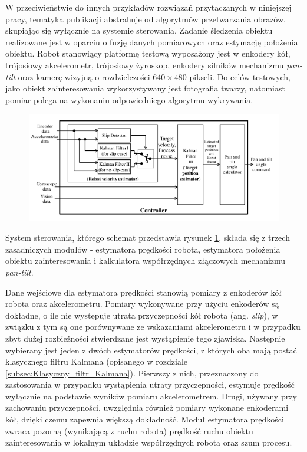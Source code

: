 {W przeciwieństwie do innych przykładów rozwiązań przytaczanych w niniejszej pracy, tematyka publikacji \cite{Kim2012} abstrahuje od algorytmów przetwarzania obrazów, skupiając się wyłącznie na systemie sterowania. Zadanie śledzenia obiektu realizowane jest w oparciu o fuzję danych pomiarowych oraz estymację położenia obiektu. Robot stanowiący platformę testową wyposażony jest w enkodery kół, trójosiowy akcelerometr, trójosiowy żyroskop, enkodery silników mechanizmu \textit{pan-tilt} oraz kamerę wizyjną o rozdzielczości $640 \times 480$ pikseli. Do celów testowych, jako obiekt zainteresowania wykorzystywany jest fotografia twarzy, natomiast pomiar polega na wykonaniu odpowiedniego algorytmu wykrywania.
\begin{figure}[!htb]
	\begin{center}
		\includegraphics[width=12cm]{images/controller_kim.png}
	\end{center}	
\label{fig:System_sterowania_Kim}
\end{figure}
System sterowania, którego schemat przedstawia rysunek \ref{fig:System_sterowania_Kim}, składa się z trzech zasadniczych modułów - estymatora prędkości robota, estymatora położenia obiektu zainteresowania i kalkulatora współrzędnych złączowych mechanizmu \textit{pan-tilt}.

Dane wejściowe dla estymatora prędkości stanowią pomiary z enkoderów kół robota oraz akcelerometru. Pomiary wykonywane przy użyciu enkoderów są dokładne, o ile nie występuje utrata przyczepności kół robota (ang. \textit{slip}), w związku z tym są one porównywane ze wskazaniami akcelerometru i w przypadku zbyt dużej rozbieżności stwierdzane jest wystąpienie tego zjawiska. Następnie wybierany jest jeden z dwóch estymatorów prędkości, z których oba mają postać klasycznego filtru Kalmana (opisanego w rozdziale \ref{subsec:Klasyczny_filtr_Kalmana}). Pierwszy z nich, przeznaczony do zastosowania w przypadku wystąpienia utraty przyczepności, estymuje prędkość wyłącznie na podstawie wyników pomiaru akcelerometrem. Drugi, używany przy zachowaniu przyczepności, uwzględnia również pomiary wykonane enkoderami kół, dzięki czemu zapewnia większą dokładność. Moduł estymatora prędkości zwraca pozorną (wynikającą z ruchu robota) prędkość ruchu obiektu zainteresowania w lokalnym układzie współrzędnych robota oraz szum procesu.

}
